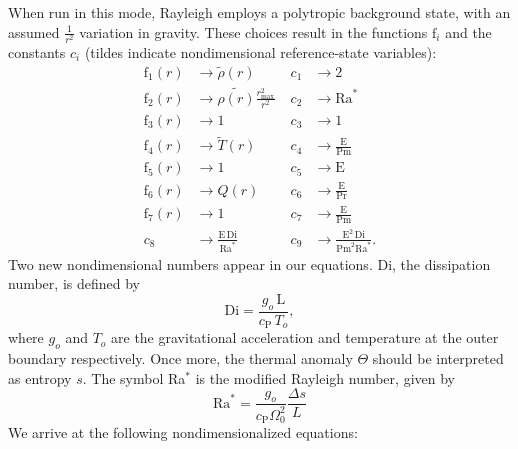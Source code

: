 \documentclass[10pt,letterpaper]{article}
\newcommand{\ff}{\mathrm{f}}
\begin{document}
When run in this mode, Rayleigh employs a polytropic background state, with an assumed $\frac{1}{r^2}$ variation in gravity.  These choices result in the functions $\ff_i$ and the constants $c_i$ (tildes indicate nondimensional reference-state variables):
\begin{align*}
    \ff_1(r) &\rightarrow \tilde{\rho}(r)\; &c_1 &\rightarrow 2 \\
    \ff_2(r) &\rightarrow \tilde{\rho(r)}\frac{r_\mathrm{max}^2}{r^2}\; &c_2 &\rightarrow \mathrm{Ra}^* \\
    \ff_3(r) &\rightarrow 1\; &c_3 &\rightarrow 1\\
    \ff_4(r) &\rightarrow \tilde{T}(r)\; &c_4 &\rightarrow \frac{\mathrm{E}}{\mathrm{Pm}} \\
    \ff_5(r) &\rightarrow 1\; &c_5 &\rightarrow \mathrm{E} \\
    \ff_6(r) &\rightarrow Q(r)\; &c_6 &\rightarrow \frac{\mathrm{E}}{\mathrm{Pr}}  \\
    \ff_7(r) &\rightarrow 1 \; &c_7 &\rightarrow \frac{\mathrm{E}}{\mathrm{Pm}} \\
    c_8&\rightarrow \frac{\mathrm{E}\,\mathrm{Di}}{\mathrm{Ra}^*} &c_9 &\rightarrow \frac{\mathrm{E}^2\,\mathrm{Di}}{\mathrm{Pm}^2\mathrm{Ra}^*}.
\end{align*}
Two new nondimensional numbers appear in our equations. Di,  the dissipation number, is defined by
\begin{equation}
    \mathrm{Di}= \frac{g_o\,\mathrm{L}}{c_\mathrm{P}\,T_o},
\end{equation}
where $g_o$ and $T_o$ are the gravitational acceleration and temperature at the outer boundary respectively. Once more, the thermal anomaly $\Theta$ should be interpreted as entropy $s$. The symbol Ra$^*$ is the modified Rayleigh number, given by
\begin{equation}
    \mathrm{Ra}^*=\frac{g_o}{c_\mathrm{P}\Omega_0^2}\frac{\Delta s}{L}   %
\end{equation}
We arrive at the following nondimensionalized equations:
\end{document}
